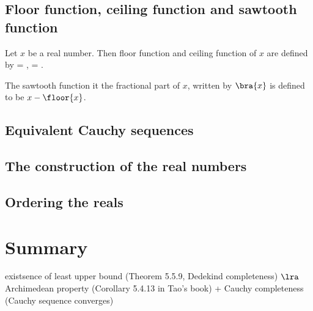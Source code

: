 \subsection{Floor function, ceiling function and sawtooth function}

\begin{definition}
Let $x$ be a real number. Then floor function and ceiling function of $x$ are defined by
\be
{} = \max{},\qquad {} = \min{}.
\ee

The sawtooth function it the fractional part of $x$, written by $\bra{x}$ is defined to be $x-\floor{x}$.
\end{definition}



\subsection{Equivalent Cauchy sequences}

\subsection{The construction of the real numbers}

\subsection{Ordering the reals}

\section{Summary}

existsence of least upper bound (Theorem 5.5.9, Dedekind completeness) $\lra$ Archimedean property (Corollary 5.4.13 in Tao's book) + Cauchy completeness (Cauchy sequence converges)











